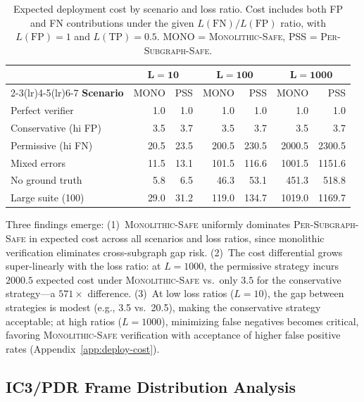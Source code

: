 \documentclass[11pt]{article}
\begin{document}
\begin{table}[h]
\centering
\caption{Expected deployment cost by scenario and loss ratio.
  Cost includes both FP and FN contributions under the given
  $L(\mathrm{FN})/L(\mathrm{FP})$ ratio, with $L(\mathrm{FP})=1$
  and $L(\mathrm{TP})=0.5$.  MONO = \textsc{Monolithic-Safe},
  PSS = \textsc{Per-Subgraph-Safe}.}
\label{tab:deploy-cost}
\small
\begin{tabular}{@{}lrrrrrr@{}}
\toprule
& \multicolumn{2}{c}{$\mathbf{L=10}$} &
  \multicolumn{2}{c}{$\mathbf{L=100}$} &
  \multicolumn{2}{c}{$\mathbf{L=1000}$} \\
\cmidrule(lr){2-3}\cmidrule(lr){4-5}\cmidrule(lr){6-7}
\textbf{Scenario} & MONO & PSS & MONO & PSS & MONO & PSS \\
\midrule
Perfect verifier      & 1.0  & 1.0  & 1.0   & 1.0   & 1.0    & 1.0 \\
Conservative (hi FP)  & 3.5  & 3.7  & 3.5   & 3.7   & 3.5    & 3.7 \\
Permissive (hi FN)    & 20.5 & 23.5 & 200.5 & 230.5 & 2000.5 & 2300.5 \\
Mixed errors          & 11.5 & 13.1 & 101.5 & 116.6 & 1001.5 & 1151.6 \\
No ground truth       & 5.8  & 6.5  & 46.3  & 53.1  & 451.3  & 518.8 \\
Large suite (100)     & 29.0 & 31.2 & 119.0 & 134.7 & 1019.0 & 1169.7 \\
\bottomrule
\end{tabular}
\end{table}

Three findings emerge: (1)~\textsc{Monolithic-Safe} uniformly
dominates \textsc{Per-Subgraph-Safe} in expected cost across all
scenarios and loss ratios, since monolithic verification eliminates
cross-subgraph gap risk.  (2)~The cost differential grows
super-linearly with the loss ratio: at $L=1000$, the permissive
strategy incurs $2000.5$ expected cost under \textsc{Monolithic-Safe}
vs.\ only $3.5$ for the conservative strategy---a $571\times$
difference.  (3)~At low loss ratios ($L=10$), the gap between
strategies is modest (e.g., 3.5 vs.\ 20.5), making the conservative
strategy acceptable; at high ratios ($L=1000$), minimizing false
negatives becomes critical, favoring \textsc{Monolithic-Safe}
verification with acceptance of higher false positive rates
(Appendix~\ref{app:deploy-cost}).


\subsection{IC3/PDR Frame Distribution Analysis}\label{sec:ic3-frames}
\end{document}
